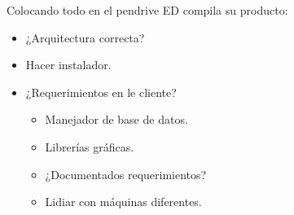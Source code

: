 \begin{frame}{Colocando todo en el pendrive}
  ED compila su producto:
  \begin{itemize}
    \item ¿Arquitectura correcta?
    \item Hacer instalador.
    \item ¿Requerimientos en le cliente?
    \begin{itemize}
      \item Manejador de base de datos.
      \item Librerías gráficas.
      \item ¿Documentados requerimientos?
      \item Lidiar con máquinas diferentes.
    \end{itemize}
  \end{itemize}
\end{frame}
